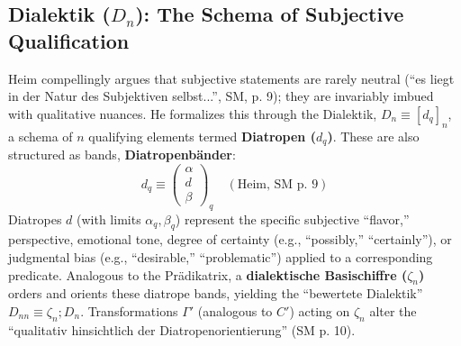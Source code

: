 \documentclass[
    12pt,              %
    a4paper,           %
    headings=normal,   %
    twoside=true,      %
    BCOR=8mm,          %
]{scrbook}
\newcommand{\q}[1]{\enquote{#1}}
\begin{document}
\subsection{Dialektik (\(D_n\)): The Schema of Subjective Qualification}
\label{sec:ch1_dialektik}
Heim compellingly argues that subjective statements are rarely neutral (\q{es liegt in der Natur des Subjektiven selbst...}, SM, p. 9); they are invariably imbued with qualitative nuances. He formalizes this through the Dialektik, \(D_n \equiv [d_q]_n\), a schema of \(n\) qualifying elements termed \textbf{Diatropen (\(d_q\))}. These are also structured as bands, \textbf{Diatropenbänder}:
\[ d_q \equiv \begin{pmatrix} \alpha \\ d \\ \beta \end{pmatrix}_q \quad (\text{Heim, SM p. 9}) \]
Diatropes \(d\) (with limits \(\alpha_q, \beta_q\)) represent the specific subjective \q{flavor,} perspective, emotional tone, degree of certainty (e.g., \q{possibly,} \q{certainly}), or judgmental bias (e.g., \q{desirable,} \q{problematic}) applied to a corresponding predicate. Analogous to the Prädikatrix, a \textbf{dialektische Basischiffre (\(\zeta_n\))} orders and orients these diatrope bands, yielding the \q{bewertete Dialektik} \(D_{nn} \equiv \zeta_n; D_n\). Transformations \(\Gamma'\) (analogous to \(C'\)) acting on \(\zeta_n\) alter the \q{qualitativ hinsichtlich der Diatropenorientierung} (SM p. 10).
\end{document}
